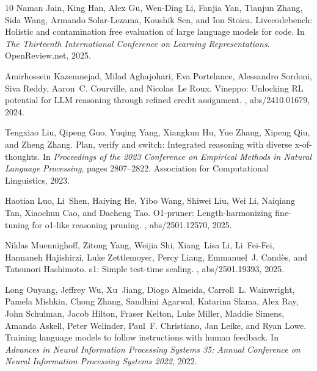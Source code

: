 \documentclass{article}
\begin{document}
{\begin{thebibliography}{10}
        Naman Jain, King Han, Alex Gu, Wen{-}Ding Li, Fanjia Yan, Tianjun Zhang, Sida Wang, Armando Solar{-}Lezama, Koushik Sen, and Ion Stoica.
        \newblock Livecodebench: Holistic and contamination free evaluation of large language models for code.
        \newblock In {\em The Thirteenth International Conference on Learning Representations}. OpenReview.net, 2025.
        
        Amirhossein Kazemnejad, Milad Aghajohari, Eva Portelance, Alessandro Sordoni, Siva Reddy, Aaron~C. Courville, and Nicolas~Le Roux.
        \newblock Vineppo: Unlocking {RL} potential for {LLM} reasoning through refined credit assignment.
        , abs/2410.01679, 2024.
        
        Tengxiao Liu, Qipeng Guo, Yuqing Yang, Xiangkun Hu, Yue Zhang, Xipeng Qiu, and Zheng Zhang.
        \newblock Plan, verify and switch: Integrated reasoning with diverse x-of-thoughts.
        \newblock In {\em Proceedings of the 2023 Conference on Empirical Methods in Natural Language Processing}, pages 2807--2822. Association for Computational Linguistics, 2023.
        
        Haotian Luo, Li~Shen, Haiying He, Yibo Wang, Shiwei Liu, Wei Li, Naiqiang Tan, Xiaochun Cao, and Dacheng Tao.
        \newblock O1-pruner: Length-harmonizing fine-tuning for o1-like reasoning pruning.
        , abs/2501.12570, 2025.
        
        Niklas Muennighoff, Zitong Yang, Weijia Shi, Xiang~Lisa Li, Li~Fei{-}Fei, Hannaneh Hajishirzi, Luke Zettlemoyer, Percy Liang, Emmanuel~J. Cand{\`{e}}s, and Tatsunori Hashimoto.
        \newblock s1: Simple test-time scaling.
        , abs/2501.19393, 2025.
        
        Long Ouyang, Jeffrey Wu, Xu~Jiang, Diogo Almeida, Carroll~L. Wainwright, Pamela Mishkin, Chong Zhang, Sandhini Agarwal, Katarina Slama, Alex Ray, John Schulman, Jacob Hilton, Fraser Kelton, Luke Miller, Maddie Simens, Amanda Askell, Peter Welinder, Paul~F. Christiano, Jan Leike, and Ryan Lowe.
        \newblock Training language models to follow instructions with human feedback.
        \newblock In {\em Advances in Neural Information Processing Systems 35: Annual Conference on Neural Information Processing Systems 2022}, 2022.
        

\end{thebibliography}}
\end{document}
